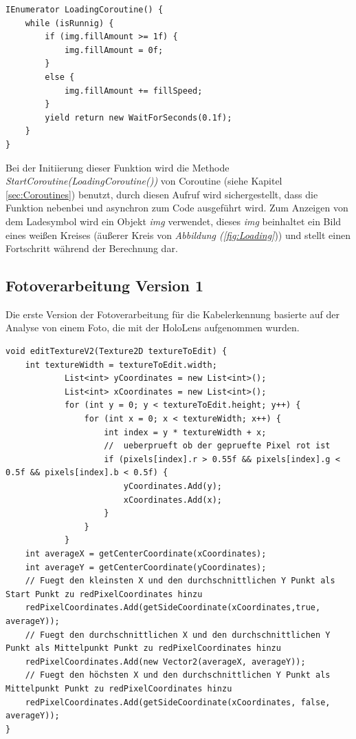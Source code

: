 \begin{lstlisting}[style=csharp, caption={Code zum ausführen des lade Symbols}, label=code:LoadingCoroutine]
IEnumerator LoadingCoroutine() {
    while (isRunnig) {
        if (img.fillAmount >= 1f) {
            img.fillAmount = 0f;
        }
        else {
            img.fillAmount += fillSpeed;
        }
        yield return new WaitForSeconds(0.1f);
    }
}
\end{lstlisting}
Bei der Initiierung dieser Funktion wird die Methode \textit{StartCoroutine(LoadingCoroutine())} von Coroutine (siehe Kapitel \ref{sec:Coroutines}) benutzt, durch diesen Aufruf wird sichergestellt, dass die Funktion nebenbei und asynchron zum Code ausgeführt wird. Zum Anzeigen von dem Ladesymbol wird ein Objekt \textit{img} verwendet, dieses \textit{img} beinhaltet ein Bild eines weißen Kreises (äußerer Kreis von \textit{Abbildung (\ref{fig:Loading}})) und stellt einen Fortschritt während der Berechnung dar.


\subsection{Fotoverarbeitung Version 1}
Die erste Version der Fotoverarbeitung für die Kabelerkennung basierte auf der Analyse von einem Foto, die mit der HoloLens aufgenommen wurden.
\begin{lstlisting}[style=csharp, caption={Erste Version der Kabel Erkennung}, label=code:debugRaycast]
void editTextureV2(Texture2D textureToEdit) {
    int textureWidth = textureToEdit.width;
            List<int> yCoordinates = new List<int>();
            List<int> xCoordinates = new List<int>();
            for (int y = 0; y < textureToEdit.height; y++) {
                for (int x = 0; x < textureWidth; x++) {
                    int index = y * textureWidth + x;
                    //  ueberprueft ob der gepruefte Pixel rot ist
                    if (pixels[index].r > 0.55f && pixels[index].g < 0.5f && pixels[index].b < 0.5f) {
                        yCoordinates.Add(y);
                        xCoordinates.Add(x);
                    }
                }
            }
    int averageX = getCenterCoordinate(xCoordinates);
    int averageY = getCenterCoordinate(yCoordinates);
    // Fuegt den kleinsten X und den durchschnittlichen Y Punkt als Start Punkt zu redPixelCoordinates hinzu
    redPixelCoordinates.Add(getSideCoordinate(xCoordinates,true, averageY));
    // Fuegt den durchschnittlichen X und den durchschnittlichen Y Punkt als Mittelpunkt Punkt zu redPixelCoordinates hinzu
    redPixelCoordinates.Add(new Vector2(averageX, averageY));
    // Fuegt den höchsten X und den durchschnittlichen Y Punkt als Mittelpunkt Punkt zu redPixelCoordinates hinzu
    redPixelCoordinates.Add(getSideCoordinate(xCoordinates, false, averageY));
}
\end{lstlisting}

